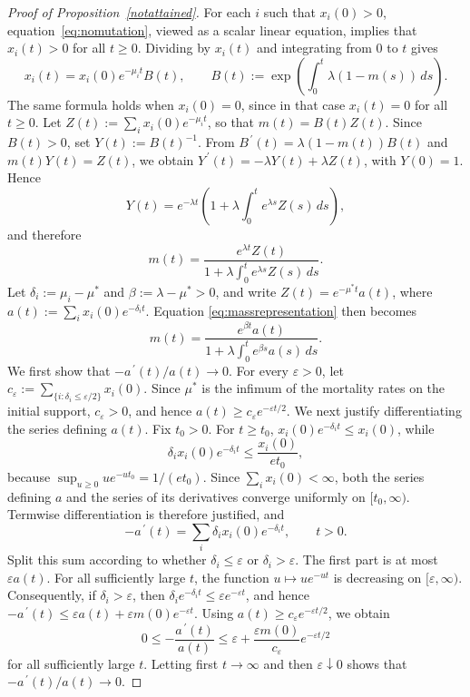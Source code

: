 \documentclass[10pt,a4paper]{amsart}
\newcommand{\myprime}{\,\prime}
\begin{document}
\begin{proof}[Proof of Proposition~\ref{notattained}]
For each $i$ such that $x_i(0)>0$, equation~\eqref{eq:nomutation},
viewed as a scalar linear equation, implies that $x_i(t)>0$ for all
$t\geq0$. Dividing by $x_i(t)$ and integrating from $0$ to $t$ gives
$$
x_i(t)=x_i(0)e^{-\mu_i t}B(t),
\qquad
B(t):=\exp\left(\int_0^t\lambda(1-m(s))\,ds\right).
$$
The same formula holds when $x_i(0)=0$, since in that case
$x_i(t)=0$ for all $t\geq0$. Let
$Z(t):=\sum_i x_i(0)e^{-\mu_i t}$, so that $m(t)=B(t)Z(t)$.
Since $B(t)>0$, set $Y(t):=B(t)^{-1}$. From
$B^{\myprime}(t)=\lambda(1-m(t))B(t)$ and $m(t)Y(t)=Z(t)$, we obtain
$Y^{\myprime}(t)=-\lambda Y(t)+\lambda Z(t)$, with $Y(0)=1$. Hence
$$
Y(t)=e^{-\lambda t}
\left(1+\lambda\int_0^t e^{\lambda s}Z(s)\,ds\right),
$$
and therefore
\begin{equation}
m(t)
=
\frac{e^{\lambda t}Z(t)}
{1+\lambda\int_0^t e^{\lambda s}Z(s)\,ds}.
\label{eq:massrepresentation}
\end{equation}
Let $\delta_i:=\mu_i-\mu^*$ and
$\beta:=\lambda-\mu^*>0$, and write
$Z(t)=e^{-\mu^*t}a(t)$, where
$a(t):=\sum_i x_i(0)e^{-\delta_i t}$. Equation
\eqref{eq:massrepresentation} then becomes
\begin{equation}
m(t)
=
\frac{e^{\beta t}a(t)}
{1+\lambda\int_0^t e^{\beta s}a(s)\,ds}.
\label{eq:massrepresentation2}
\end{equation}
We first show that $-a^{\myprime}(t)/a(t)\to 0$. For every $\varepsilon>0$, let
$c_\varepsilon:=\sum_{\{i:\delta_i\leq\varepsilon/2\}}x_i(0)$.
Since $\mu^*$ is the infimum of the mortality rates on the initial
support, $c_\varepsilon>0$, and hence
$a(t)\geq c_\varepsilon e^{-\varepsilon t/2}$.
We next justify differentiating the series defining $a(t)$. Fix
$t_0>0$. For $t\geq t_0$,
$x_i(0)e^{-\delta_i t}\leq x_i(0)$, while
$$
\delta_i x_i(0)e^{-\delta_i t}
\leq \frac{x_i(0)}{e t_0},
$$
because $\sup_{u\geq0}ue^{-ut_0}=1/(e t_0)$. Since
$\sum_i x_i(0)<\infty$, both the series defining $a$ and the series of
its derivatives converge uniformly on $[t_0,\infty)$. Termwise
differentiation is therefore justified, and
$$
-a^{\myprime}(t)=\sum_i\delta_i x_i(0)e^{-\delta_i t},
\qquad t>0.
$$
Split this sum according to whether $\delta_i\leq\varepsilon$ or
$\delta_i>\varepsilon$. The first part is at most $\varepsilon a(t)$.
For all sufficiently large $t$, the function
$u\mapsto ue^{-ut}$ is decreasing on $[\varepsilon,\infty)$.
Consequently, if $\delta_i>\varepsilon$, then
$\delta_i e^{-\delta_i t}\leq\varepsilon e^{-\varepsilon t}$, and
hence
$-a^{\myprime}(t) \leq \varepsilon a(t)+\varepsilon m(0)e^{-\varepsilon t}$.
Using $a(t)\geq c_\varepsilon e^{-\varepsilon t/2}$, we obtain
$$
0\leq-\frac{a^{\myprime}(t)}{a(t)}
\leq
\varepsilon+
\frac{\varepsilon m(0)}{c_\varepsilon}
e^{-\varepsilon t/2}
$$
for all sufficiently large $t$. Letting first $t\to\infty$ and then
$\varepsilon\downarrow0$ shows that $-a^{\myprime}(t)/a(t)\to 0$.


\end{proof}
\end{document}

